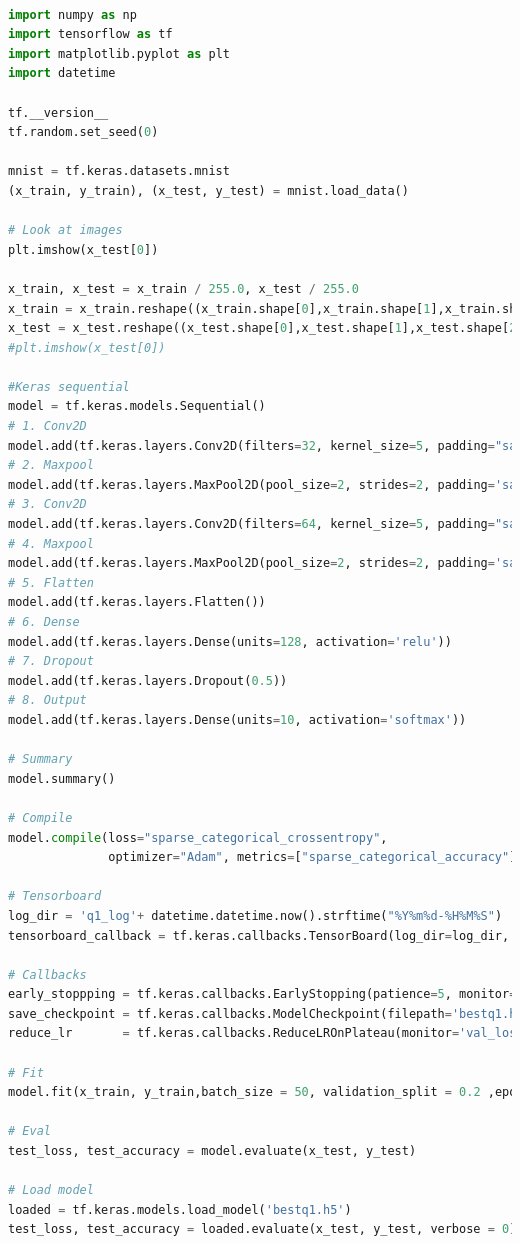 \documentclass[11pt]{article}
\begin{document}
\begin{lstlisting}[language=Python, basicstyle=\tiny, caption=KERAS Sequential model for mnist classification]

import numpy as np
import tensorflow as tf
import matplotlib.pyplot as plt
import datetime

tf.__version__
tf.random.set_seed(0)

mnist = tf.keras.datasets.mnist
(x_train, y_train), (x_test, y_test) = mnist.load_data()

# Look at images
plt.imshow(x_test[0])

x_train, x_test = x_train / 255.0, x_test / 255.0
x_train = x_train.reshape((x_train.shape[0],x_train.shape[1],x_train.shape[2],1))
x_test = x_test.reshape((x_test.shape[0],x_test.shape[1],x_test.shape[2],1))
#plt.imshow(x_test[0])

#Keras sequential
model = tf.keras.models.Sequential()
# 1. Conv2D
model.add(tf.keras.layers.Conv2D(filters=32, kernel_size=5, padding="same", activation="relu", input_shape=(28,28,1)))
# 2. Maxpool
model.add(tf.keras.layers.MaxPool2D(pool_size=2, strides=2, padding='same'))
# 3. Conv2D
model.add(tf.keras.layers.Conv2D(filters=64, kernel_size=5, padding="same", activation="relu"))
# 4. Maxpool
model.add(tf.keras.layers.MaxPool2D(pool_size=2, strides=2, padding='same'))
# 5. Flatten
model.add(tf.keras.layers.Flatten())
# 6. Dense
model.add(tf.keras.layers.Dense(units=128, activation='relu'))
# 7. Dropout
model.add(tf.keras.layers.Dropout(0.5))
# 8. Output
model.add(tf.keras.layers.Dense(units=10, activation='softmax'))

# Summary
model.summary()

# Compile
model.compile(loss="sparse_categorical_crossentropy",
              optimizer="Adam", metrics=["sparse_categorical_accuracy"])

# Tensorboard
log_dir = 'q1_log'+ datetime.datetime.now().strftime("%Y%m%d-%H%M%S")
tensorboard_callback = tf.keras.callbacks.TensorBoard(log_dir=log_dir, histogram_freq=1, write_graph=True, write_images=True)

# Callbacks
early_stoppping = tf.keras.callbacks.EarlyStopping(patience=5, monitor='val_loss', min_delta=1e-4, verbose=1)
save_checkpoint = tf.keras.callbacks.ModelCheckpoint(filepath='bestq1.h5', save_best_only=True, monitor='val_loss', verbose=1)
reduce_lr       = tf.keras.callbacks.ReduceLROnPlateau(monitor='val_loss', factor=0.2,patience=2, min_lr=1e-2, verbose=1)

# Fit
model.fit(x_train, y_train,batch_size = 50, validation_split = 0.2 ,epochs=5000, callbacks=[tensorboard_callback, early_stoppping, save_checkpoint, reduce_lr])

# Eval
test_loss, test_accuracy = model.evaluate(x_test, y_test)

# Load model
loaded = tf.keras.models.load_model('bestq1.h5')
test_loss, test_accuracy = loaded.evaluate(x_test, y_test, verbose = 0)
\end{lstlisting}
\end{document}

